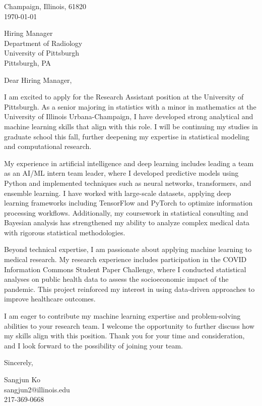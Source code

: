 \documentclass[11pt]{article}
\begin{document}
\noindent
Champaign, Illinois, 61820 \\
\today
\vspace{2em}

\noindent
Hiring Manager \\
Department of Radiology \\
University of Pittsburgh \\
Pittsburgh, PA \\

\vspace{1.5em}

Dear Hiring Manager,

I am excited to apply for the Research Assistant position at the University of Pittsburgh. As a senior majoring in statistics with a minor in mathematics at the University of Illinois Urbana-Champaign, I have developed strong analytical and machine learning skills that align with this role. I will be continuing my studies in graduate school this fall, further deepening my expertise in statistical modeling and computational research.

My experience in artificial intelligence and deep learning includes leading a team as an AI/ML intern team leader, where I developed predictive models using Python and implemented techniques such as neural networks, transformers, and ensemble learning. I have worked with large-scale datasets, applying deep learning frameworks including TensorFlow and PyTorch to optimize information processing workflows. Additionally, my coursework in statistical consulting and Bayesian analysis has strengthened my ability to analyze complex medical data with rigorous statistical methodologies.

Beyond technical expertise, I am passionate about applying machine learning to medical research. My research experience includes participation in the COVID Information Commons Student Paper Challenge, where I conducted statistical analyses on public health data to assess the socioeconomic impact of the pandemic. This project reinforced my interest in using data-driven approaches to improve healthcare outcomes.

I am eager to contribute my machine learning expertise and problem-solving abilities to your research team. I welcome the opportunity to further discuss how my skills align with this position. Thank you for your time and consideration, and I look forward to the possibility of joining your team.


\vspace{1em}

Sincerely,

\vspace{2em}

\noindent
Sangjun Ko\\
sangjun2@illinois.edu\\
217-369-0668
\end{document}
